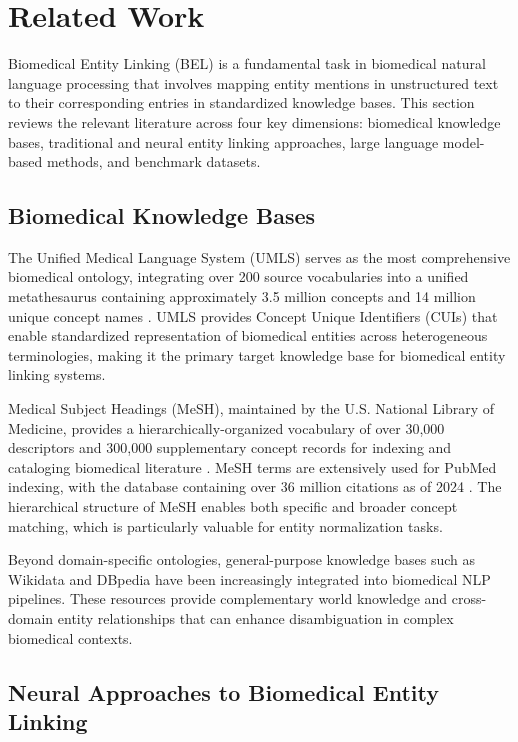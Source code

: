 \section{Related Work}
\label{sec:related_work}

Biomedical Entity Linking (BEL) is a fundamental task in biomedical natural language processing that involves mapping entity mentions in unstructured text to their corresponding entries in standardized knowledge bases. This section reviews the relevant literature across four key dimensions: biomedical knowledge bases, traditional and neural entity linking approaches, large language model-based methods, and benchmark datasets.

\subsection{Biomedical Knowledge Bases}

The Unified Medical Language System (UMLS) serves as the most comprehensive biomedical ontology, integrating over 200 source vocabularies into a unified metathesaurus containing approximately 3.5 million concepts and 14 million unique concept names \cite{bodenreider2004umls}. UMLS provides Concept Unique Identifiers (CUIs) that enable standardized representation of biomedical entities across heterogeneous terminologies, making it the primary target knowledge base for biomedical entity linking systems.

Medical Subject Headings (MeSH), maintained by the U.S. National Library of Medicine, provides a hierarchically-organized vocabulary of over 30,000 descriptors and 300,000 supplementary concept records for indexing and cataloging biomedical literature \cite{mesh2024}. MeSH terms are extensively used for PubMed indexing, with the database containing over 36 million citations as of 2024 \cite{pubmed_stats2024}. The hierarchical structure of MeSH enables both specific and broader concept matching, which is particularly valuable for entity normalization tasks.

Beyond domain-specific ontologies, general-purpose knowledge bases such as Wikidata \cite{vrandecic2014wikidata} and DBpedia \cite{lehmann2015dbpedia} have been increasingly integrated into biomedical NLP pipelines. These resources provide complementary world knowledge and cross-domain entity relationships that can enhance disambiguation in complex biomedical contexts.

\subsection{Neural Approaches to Biomedical Entity Linking}

